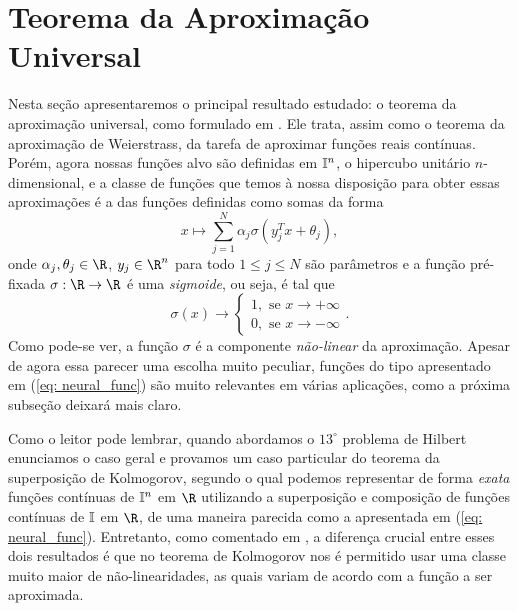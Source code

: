 
\section{Teorema da Aproximação Universal}

Nesta seção apresentaremos o principal resultado estudado: o teorema da aproximação universal, como formulado em \cite{cybenko89}.
Ele trata, assim como o teorema da aproximação de Weierstrass, da tarefa de aproximar funções reais contínuas.
Porém, agora nossas funções alvo são definidas em \( \mathbb{I}^{ n } \), o hipercubo unitário \( n \)-dimensional, e a classe de funções que temos à nossa disposição para obter essas aproximações é a das funções definidas como somas da forma
\begin{equation}
    x \mapsto \sum_{ j=1 }^{ N } \alpha_{ j } \sigma(y_{ j }^{ T }x + \theta_{ j })
    \label{eq: neural_func}
,\end{equation}
onde \( \alpha_{ j }, \theta_{ j } \in \R \), \( y_{ j } \in \R^{ n } \) para todo \( 1 \leq j \leq N \) são parâmetros e a função pré-fixada \( \sigma : \R \to \R \) é uma \emph{sigmoide}, ou seja, é tal que
\begin{equation}
    \sigma(x) \to
    \begin{cases}
        1, \text{ se } x \to +\infty \\
        0, \text{ se } x \to -\infty
    \end{cases}
.\end{equation}
Como pode-se ver, a função \( \sigma \) é a componente \emph{não-linear} da aproximação.
Apesar de agora essa parecer uma escolha muito peculiar, funções do tipo apresentado em (\ref{eq: neural_func}) são muito relevantes em várias aplicações, como a próxima subseção deixará mais claro.

Como o leitor pode lembrar, quando abordamos o \( 13^{ \circ } \) problema de Hilbert enunciamos o caso geral e provamos um caso particular do teorema da superposição de Kolmogorov, segundo o qual podemos representar de forma \emph{exata} funções contínuas de \( \mathbb{I}^{ n } \) em \( \R \) utilizando a superposição e composição de funções contínuas de \( \mathbb{I} \) em \( \R \), de uma maneira parecida como a apresentada em (\ref{eq: neural_func}).
Entretanto, como comentado em \cite{cybenko89}, a diferença crucial entre esses dois resultados é que no teorema de Kolmogorov nos é permitido usar uma classe muito maior de não-linearidades, as quais variam de acordo com a função a ser aproximada.

